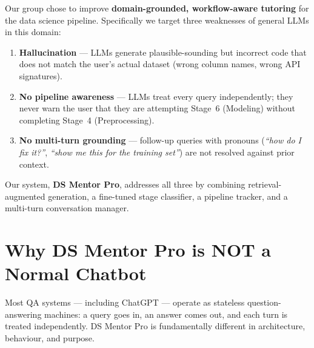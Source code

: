 \documentclass[12pt,a4paper]{article}
\begin{document}
Our group chose to improve \textbf{domain-grounded, workflow-aware tutoring} for the data science pipeline. Specifically we target three weaknesses of general LLMs in this domain:

\begin{enumerate}[leftmargin=*, label=\arabic*.]
  \item \textbf{Hallucination} --- LLMs generate plausible-sounding but incorrect code that does not match the user's actual dataset (wrong column names, wrong API signatures).
  \item \textbf{No pipeline awareness} --- LLMs treat every query independently; they never warn the user that they are attempting Stage~6 (Modeling) without completing Stage~4 (Preprocessing).
  \item \textbf{No multi-turn grounding} --- follow-up queries with pronouns (\textit{``how do I fix it?''}, \textit{``show me this for the training set''}) are not resolved against prior context.
\end{enumerate}

Our system, \textbf{DS Mentor Pro}, addresses all three by combining retrieval-augmented generation, a fine-tuned stage classifier, a pipeline tracker, and a multi-turn conversation manager.

\section{Why DS Mentor Pro is NOT a Normal Chatbot}

Most QA systems --- including ChatGPT --- operate as stateless question-answering machines: a query goes in, an answer comes out, and each turn is treated independently. DS Mentor Pro is fundamentally different in architecture, behaviour, and purpose.
\end{document}
